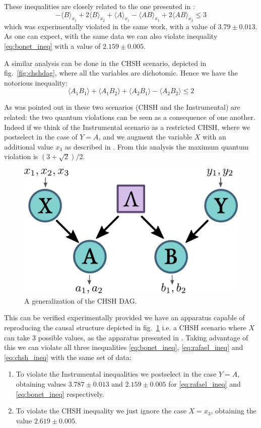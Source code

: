 \documentclass{article}
\newcommand{\avg}[1]{\langle#1\rangle}
\begin{document}
These inequalities are closely related to the one presented in \cite{chaves2018}:
\begin{equation}
    -\avg{B}_{x_1} + 2 \avg{B}_{x_2} + \avg{A}_{x_1} - \avg{AB}_{x_1} +
    2\avg{AB}_{x_3} \le 3  
    \label{eq:rafael_ineq}
\end{equation}
which was experimentally violated in the same work, with a value of $3.79 \pm 0.013$.
As one can expect, with the same data we can also violate inequality
\eqref{eq:bonet_ineq} with a value of $2.159 \pm 0.005$.

A similar analysis can be done in the CHSH scenario, depicted in
fig.~\ref{fig:chshdag},
where all the variables are dichotomic.
Hence we have the notorious inequality:
\begin{equation}
    \avg{A_1B_1} + \avg{A_1B_2} + \avg{A_2B_1} - \avg{A_2B_2} \le 2
    \label{eq:chsh_ineq}
\end{equation}

As was pointed out in \cite{himbeeck2018} these two scenarios (CHSH and the Instrumental)
are related: the two quantum violations can be
seen as a consequence of one another.
Indeed if we think of the Instrumental scenario as a restricted CHSH,
where we postselect in the case of $Y = A$, and we augment the variable $X$ with
an additional value $x_3$ as described in \cite{himbeeck2018}.
From this analysis the maximum quantum violation is $(3 + \sqrt{2})/2$.

\begin{figure}[h]
    \centering
    \includegraphics[width=.5\textwidth]{images/genchshdag.pdf}
    \caption{A generalization of the CHSH DAG.}
    \label{fig:genchshdag}
\end{figure}
This can be verified experimentally provided we have an apparatus capable of
reproducing the causal structure depicted in fig.~\ref{fig:genchshdag} i.e. a CHSH scenario
where $X$ can take 3 possible values, as the apparatus presented in
\cite{chaves2018}.
Taking advantage of this we can violate all three inequalities
\eqref{eq:bonet_ineq}, \eqref{eq:rafael_ineq} and \eqref{eq:chsh_ineq} with the same set of
data:
\begin{enumerate}
    \item To violate the Instrumental inequalities we postselect in the case
        $Y = A$, obtaining values $3.787 \pm 0.013$ and $2.159 \pm 0.005$ for \eqref{eq:rafael_ineq} and
        \eqref{eq:bonet_ineq} respectively.
    \item To violate the CHSH inequality we just ignore the case $X = x_3$,
        obtaining the value $2.619 \pm 0.005$.
\end{enumerate}
\end{document}
